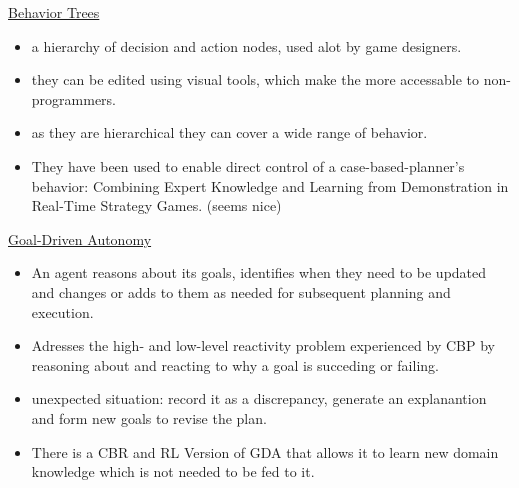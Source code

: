 \underline{Behavior Trees}
\begin{itemize}[noitemsep,nolistsep]
	\item a hierarchy of decision and action nodes, used alot by game designers.
	\item they can be edited using visual tools, which make the more accessable to non-programmers.
	\item as they are hierarchical they can cover a wide range of behavior. 
	\item They have been used to enable direct control of a case-based-planner's behavior: Combining Expert Knowledge and Learning from Demonstration in Real-Time Strategy Games. (seems nice)
\end{itemize}
\underline{Goal-Driven Autonomy}
\begin{itemize}[noitemsep,nolistsep]
	\item An agent reasons about its goals, identifies when they need to be updated and changes or adds to them as needed for subsequent planning and execution.
	\item Adresses the high- and low-level reactivity problem experienced by CBP by reasoning about and reacting to why a goal is succeding or failing.
	\item unexpected situation: record it as a discrepancy, generate an explanantion and form new goals to revise the plan.
	\item There is a CBR and RL Version of GDA that allows it to learn new domain knowledge which is not needed to be fed to it.
\end{itemize}


